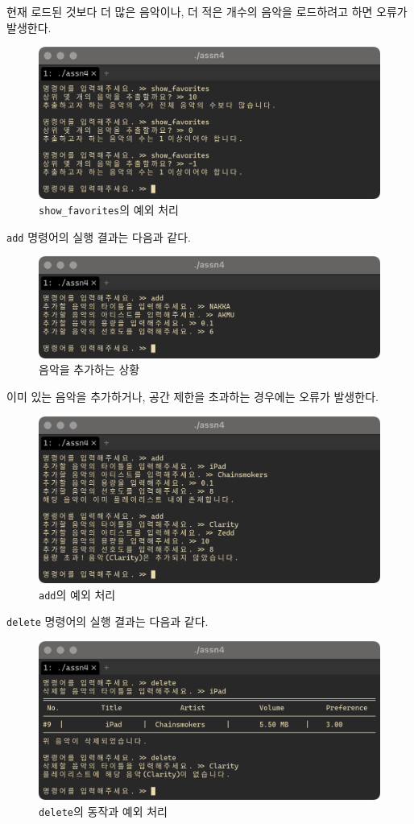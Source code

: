 \documentclass[titlepage]{article}
\begin{document}
현재 로드된 것보다 더 많은 음악이나, 더 적은 개수의 음악을 로드하려고 하면 오류가 발생한다.

\begin{figure}[H]
  \centering
  \includegraphics[width=0.7\linewidth]{show_favorites_validation.png}
  \caption{\texttt{show\_favorites}의 예외 처리}
\end{figure}

\texttt{add} 명령어의 실행 결과는 다음과 같다.

\begin{figure}[H]
  \centering
  \includegraphics[width=0.7\linewidth]{add.png}
  \caption{음악을 추가하는 상황}
\end{figure}

이미 있는 음악을 추가하거나, 공간 제한을 초과하는 경우에는 오류가 발생한다.

\begin{figure}[H]
  \centering
  \includegraphics[width=0.7\linewidth]{add_validation.png}
  \caption{\texttt{add}의 예외 처리}
\end{figure}

\texttt{delete} 명령어의 실행 결과는 다음과 같다.

\begin{figure}[H]
  \centering
  \includegraphics[width=0.7\linewidth]{delete.png}
  \caption{\texttt{delete}의 동작과 예외 처리}
\end{figure}
\end{document}
